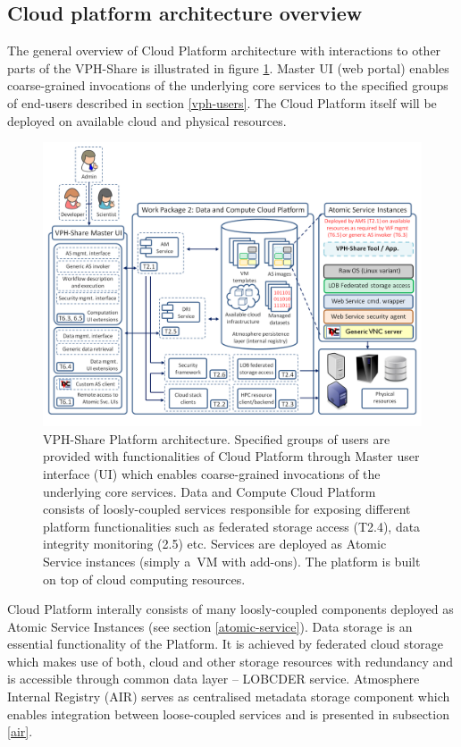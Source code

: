 \subsection{Cloud platform architecture overview}

The general overview of Cloud Platform architecture with interactions to other parts of
the VPH-Share is illustrated in figure \ref{fig:vph-architecture}. Master UI (web portal) enables
coarse-grained invocations of the underlying core services to the specified groups of
end-users described in section \ref{vph-users}. The Cloud Platform itself will be deployed on
available cloud and physical resources.

\begin{figure}[h!]
	\centering
	\includegraphics[width=\textwidth]{images/vph-architecture.png}
	\caption{VPH-Share Platform architecture. Specified groups of users are provided with
	functionalities of Cloud Platform through Master user interface (UI) which enables
	coarse-grained invocations of the underlying core services. Data and Compute Cloud
	Platform consists of loosly-coupled services responsible for exposing different platform
	functionalities such as federated storage access (T2.4), data integrity monitoring
	(2.5) etc. Services are deployed as Atomic Service instances (simply a~VM with add-ons).
	The platform is built on top of cloud computing resources.}
	\label{fig:vph-architecture}
\end{figure}

Cloud Platform interally consists of many loosly-coupled components deployed as Atomic Service
Instances (see section \ref{atomic-service}). Data storage is an essential functionality of
the Platform. It is achieved by
federated cloud storage which makes use of both, cloud and other storage
resources with redundancy and is accessible through common data layer --
LOBCDER service. Atmosphere Internal Registry (AIR) serves as
centralised metadata storage component which enables integration between 
loose-coupled services and is presented in subsection \ref{air}.

